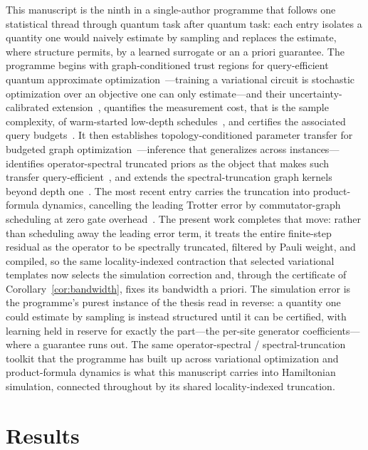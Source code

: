 \documentclass[aps,prxquantum,reprint,superscriptaddress,nofootinbib,amsmath,amssymb]{revtex4-2}
\begin{document}
This manuscript is the ninth in a single-author programme that follows one statistical thread through quantum task after quantum task: each entry isolates a quantity one would naively estimate by sampling and replaces the estimate, where structure permits, by a learned surrogate or an a priori guarantee. The programme begins with graph-conditioned trust regions for query-efficient quantum approximate optimization~\cite{huynh2026gctr}---training a variational circuit is stochastic optimization over an objective one can only estimate---and their uncertainty-calibrated extension~\cite{huynh2026gctrcalpro}, quantifies the measurement cost, that is the sample complexity, of warm-started low-depth schedules~\cite{huynh2026meascost}, and certifies the associated query budgets~\cite{huynh2026certqb}. It then establishes topology-conditioned parameter transfer for budgeted graph optimization~\cite{huynh2026paramxferB}---inference that generalizes across instances---identifies operator-spectral truncated priors as the object that makes such transfer query-efficient~\cite{huynh2026ostqaoa}, and extends the spectral-truncation graph kernels beyond depth one~\cite{huynh2026topoqaoa}. The most recent entry carries the truncation into product-formula dynamics, cancelling the leading Trotter error by commutator-graph scheduling at zero gate overhead~\cite{huynh2026topoham}. The present work completes that move: rather than scheduling away the leading error term, it treats the entire finite-step residual as the operator to be spectrally truncated, filtered by Pauli weight, and compiled, so the same locality-indexed contraction that selected variational templates now selects the simulation correction and, through the certificate of Corollary~\ref{cor:bandwidth}, fixes its bandwidth a priori. The simulation error is the programme's purest instance of the thesis read in reverse: a quantity one could estimate by sampling is instead structured until it can be certified, with learning held in reserve for exactly the part---the per-site generator coefficients---where a guarantee runs out. The same operator-spectral / spectral-truncation toolkit that the programme has built up across variational optimization and product-formula dynamics is what this manuscript carries into Hamiltonian simulation, connected throughout by its shared locality-indexed truncation.


\section{Results}
\label{sec:results}
\end{document}
